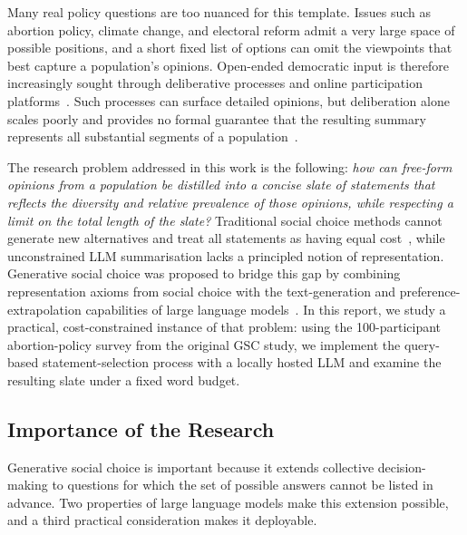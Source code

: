 \documentclass[letterpaper,11pt]{article}
\theoremstyle{plain}
\theoremstyle{definition}
\begin{document}
Many real policy questions are too nuanced for this template. Issues such as abortion policy, climate change, and electoral reform admit a very large space of possible positions, and a short fixed list of options can omit the viewpoints that best capture a population's opinions. Open-ended democratic input is therefore increasingly sought through deliberative processes and online participation platforms~\citep{fish2026gsc,boehmer2025nextgen}. Such processes can surface detailed opinions, but deliberation alone scales poorly and provides no formal guarantee that the resulting summary represents all substantial segments of a population~\citep{fish2026gsc}.

The research problem addressed in this work is the following: \emph{how can free-form opinions from a population be distilled into a concise slate of statements that reflects the diversity and relative prevalence of those opinions, while respecting a limit on the total length of the slate?} Traditional social choice methods cannot generate new alternatives and treat all statements as having equal cost~\citep{boehmer2025nextgen}, while unconstrained LLM summarisation lacks a principled notion of representation. Generative social choice was proposed to bridge this gap by combining representation axioms from social choice with the text-generation and preference-extrapolation capabilities of large language models~\citep{fish2026gsc}. In this report, we study a practical, cost-constrained instance of that problem: using the 100-participant abortion-policy survey from the original GSC study, we implement the query-based statement-selection process with a locally hosted LLM and examine the resulting slate under a fixed word budget.

\subsection{Importance of the Research}

Generative social choice is important because it extends collective decision-making to questions for which the set of possible answers cannot be listed in advance. Two properties of large language models make this extension possible, and a third practical consideration makes it deployable. \smallskip
\end{document}
